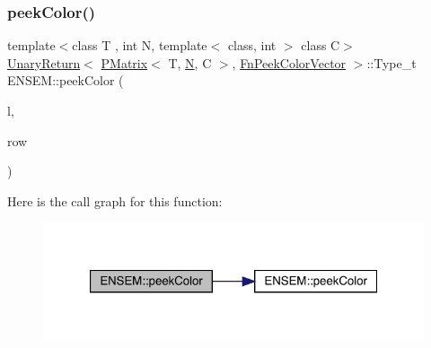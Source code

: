 \subsubsection{\texorpdfstring{peekColor()}{peekColor()}\hspace{0.1cm}{\footnotesize\ttfamily [1/2]}}
{\footnotesize\ttfamily template$<$class T , int N, template$<$ class, int $>$ class C$>$ \\
\mbox{\hyperlink{structENSEM_1_1UnaryReturn}{Unary\+Return}}$<$ \mbox{\hyperlink{classENSEM_1_1PMatrix}{P\+Matrix}}$<$ T, \mbox{\hyperlink{operator__name__util_8cc_a7722c8ecbb62d99aee7ce68b1752f337}{N}}, C $>$, \mbox{\hyperlink{structENSEM_1_1FnPeekColorVector}{Fn\+Peek\+Color\+Vector}} $>$\+::Type\+\_\+t E\+N\+S\+E\+M\+::peek\+Color (\begin{DoxyParamCaption}\item[{const \mbox{\hyperlink{classENSEM_1_1PMatrix}{P\+Matrix}}$<$ T, \mbox{\hyperlink{operator__name__util_8cc_a7722c8ecbb62d99aee7ce68b1752f337}{N}}, C $>$ \&}]{l,  }\item[{int}]{row }\end{DoxyParamCaption})\hspace{0.3cm}{\ttfamily [inline]}}

Here is the call graph for this function\+:\nopagebreak
\begin{figure}[H]
\begin{center}
\leavevmode
\includegraphics[width=321pt]{df/d0a/group__primmatrix_ga95fe2504ecc461173cb780afe6dbbbf4_cgraph}
\end{center}
\end{figure}
\mbox{\label{group__primmatrix_gaa9e8d0698d08d9e4b6924a14192c17b4}} 
